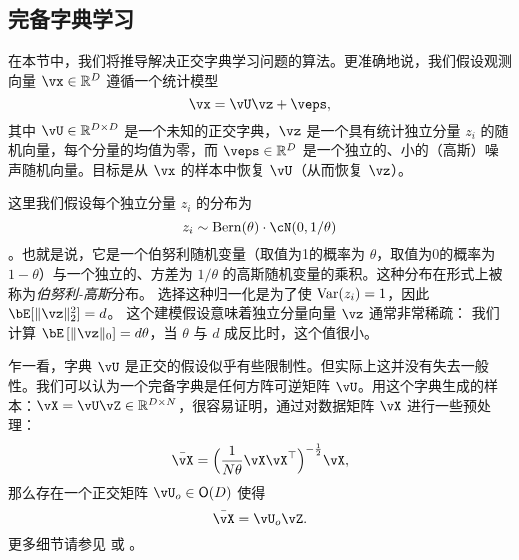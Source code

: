 \documentclass[../../book-main.tex]{subfiles}
\begin{document}
\subsection{完备字典学习}
\label{sec:complete-dictionary}

在本节中，我们将推导解决正交字典学习问题的算法。更准确地说，我们假设观测向量 $\vx \in \R^D$ 遵循一个统计模型
\begin{equation}
    \vx = \vU \vz + \veps, 
    \label{eq:ica-model-ch2}
\end{equation}
其中 $\vU \in \R^{D \times D}$ 是一个未知的正交字典，$\vz$ 是一个具有统计独立分量 $z_i$ 的随机向量，每个分量的均值为零，而 $\veps \in \R^D$ 是一个独立的、小的（高斯）噪声随机向量。目标是从 $\vx$ 的样本中恢复 $\vU$（从而恢复 $\vz$）。

这里我们假设每个独立分量 $z_i$ 的分布为 $$z_i \sim \mathrm{Bern}(\theta) \cdot \cN(0, 1/\theta)$$。也就是说，它是一个伯努利随机变量（取值为1的概率为 $\theta$，取值为0的概率为 $1-\theta$）与一个独立的、方差为 $1/\theta$ 的高斯随机变量的乘积。这种分布在形式上被称为\textit{伯努利-高斯}分布。
选择这种归一化是为了使 $\operatorname{Var}(z_i) = 1$，因此 $\bE[\norm{\vz}_2^2]=d$。
这个建模假设意味着独立分量向量 $\vz$ 通常非常稀疏：
我们计算 $\bE\left[\norm{\vz}_0\right] = d\theta$，当 $\theta$ 与 $d$ 成反比时，这个值很小。

\begin{remark}[正交假设] 
乍一看，字典 $\vU$ 是正交的假设似乎有些限制性。但实际上这并没有失去一般性。我们可以认为一个完备字典是任何方阵可逆矩阵 $\vU$。用这个字典生成的样本：$\vX = \vU \vZ \in \mathbb{R}^{D\times N}$，很容易证明，通过对数据矩阵 $\vX$ 进行一些预处理：
\begin{equation}
    \bar{\vX} = \Big(\frac{1}{N\theta} \vX\vX^\top\Big)^{-\frac{1}{2}}\vX,
\end{equation}
那么存在一个正交矩阵 $\vU_{o} \in \O(D)$ 使得
\begin{equation}
    \bar{\vX} = \vU_{o}\vZ.
\end{equation}
    更多细节请参见  或 \cite{sun2017completeI}。
\end{remark}
\end{document}
